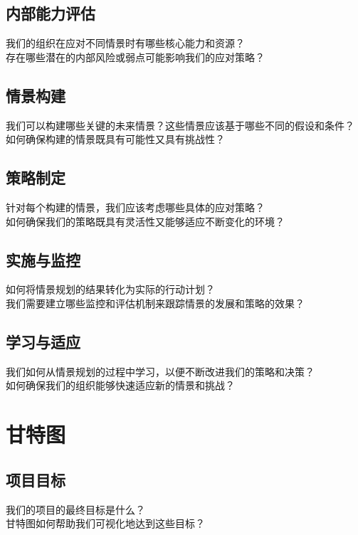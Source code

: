 \documentclass[12pt]{book}
\begin{document}
\subsection{内部能力评估}
我们的组织在应对不同情景时有哪些核心能力和资源？\\
存在哪些潜在的内部风险或弱点可能影响我们的应对策略？\\

\subsection{情景构建}
我们可以构建哪些关键的未来情景？这些情景应该基于哪些不同的假设和条件？\\
如何确保构建的情景既具有可能性又具有挑战性？\\

\subsection{策略制定}
针对每个构建的情景，我们应该考虑哪些具体的应对策略？\\
如何确保我们的策略既具有灵活性又能够适应不断变化的环境？\\

\subsection{实施与监控}
如何将情景规划的结果转化为实际的行动计划？\\
我们需要建立哪些监控和评估机制来跟踪情景的发展和策略的效果？\\

\subsection{学习与适应}
我们如何从情景规划的过程中学习，以便不断改进我们的策略和决策？\\
如何确保我们的组织能够快速适应新的情景和挑战？\\


\section{甘特图}
\subsection{项目目标}
我们的项目的最终目标是什么？\\
甘特图如何帮助我们可视化地达到这些目标？\\
\end{document}

